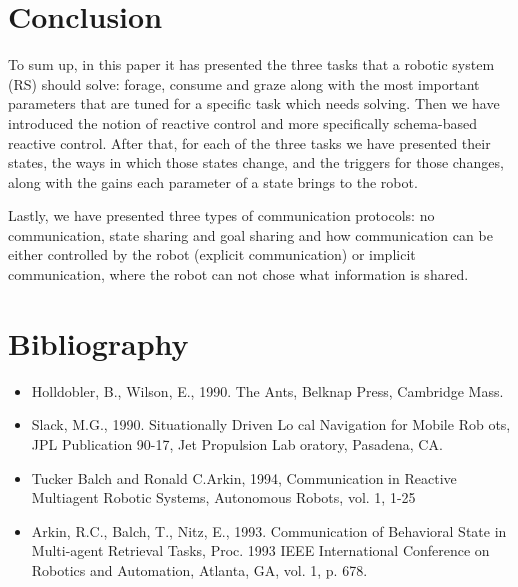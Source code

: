 \documentclass[12pt]{report}
\begin{document}
\chapter{Conclusion}

To sum up, in this paper it has presented the three tasks that a robotic system (RS) should solve: forage, consume and graze along with the most important parameters that are tuned for a specific task which needs solving. Then we have introduced the notion of reactive control and more specifically schema-based reactive control. After that, for each of the three tasks we have presented their states, the ways in which those states change, and the triggers for those changes, along with the gains each parameter of a state brings to the robot.

Lastly, we have presented three types of communication protocols: no communication, state sharing and  goal sharing and how communication can be either controlled by the robot (explicit communication) or implicit communication, where the robot can not chose what information is shared.











\chapter{Bibliography}

\begin{itemize}

\item  Holldobler, B., Wilson, E., 1990. The Ants, Belknap Press, Cambridge Mass.


\item Slack, M.G., 1990. Situationally Driven Lo cal Navigation for Mobile Rob ots, JPL Publication 90-17, Jet Propulsion Lab oratory, Pasadena, CA.


\item Tucker Balch and Ronald C.Arkin, 1994, Communication in Reactive Multiagent Robotic Systems,  Autonomous Robots, vol. 1, 1-25 


\item Arkin, R.C., Balch, T., Nitz, E., 1993. Communication of Behavioral State in Multi-agent Retrieval Tasks, Proc. 1993 IEEE International Conference on Robotics and Automation, Atlanta, GA, vol. 1, p. 678.

\end{itemize}
\end{document}

